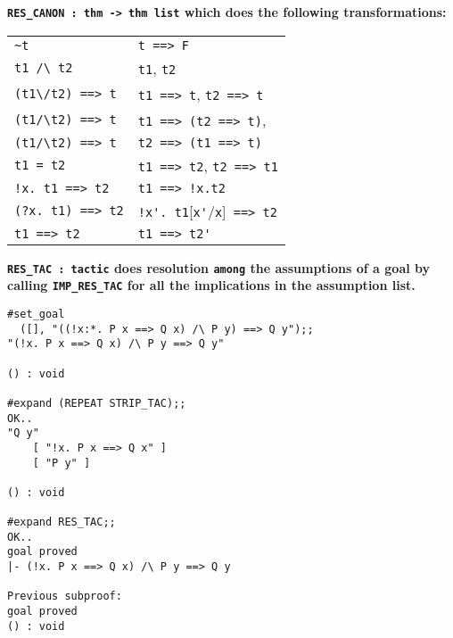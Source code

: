 \vskip7mm
\bspindent\Large\bf
\verb!RES_CANON : thm -> thm list!
\espindent
\vskip7mm
\bpindent\LARGE\bf
which does the following transformations:
\espindent
\vskip7mm
{\Large
\noindent\begin{tabular}{@{\hskip\sind}l%
@{\quad$\Longrightarrow$\quad}l@{\qquad}}
  \verb!~t!    
  &  \verb!t ==> F!\\
  \verb!t1 /\ t2!	
  &  \verb!t1!, \verb!t2!\\
  \verb!(t1\/t2) ==> t !	
  &  \verb!t1 ==> t!, \verb!t2 ==> t!\\
  \verb+(t1/\t2) ==> t+ 
  &  \verb!t1 ==> (t2 ==> t)!, \\
  \verb+(t1/\t2) ==> t+  & \verb!t2 ==> (t1 ==> t)! \\
  \verb!t1 = t2!
  &  \verb!t1 ==> t2!, \verb!t2 ==> t1! \\
  \verb+!x. t1 ==> t2+ &
  \verb+t1 ==> !x.t2+ \\
  \verb+(?x. t1) ==> t2+ &
  \verb+!x'. t1+[\verb!x'!/\verb!x!]\verb+ ==> t2+ \\
  \verb!t1 ==> t2! & \verb!t1 ==> t2'! \\
\end{tabular}}





\vskip5mm
\bspindent\Large\bf
\verb!RES_TAC : tactic!
\espindent
\vskip5mm
\bpindent\LARGE\bf
does resolution {\tt among\/} the assumptions of a goal by 
calling {\tt IMP\_RES\_TAC} for all the implications in the assumption list.
\epindent




\begin{session}\begin{verbatim}
#set_goal 
  ([], "((!x:*. P x ==> Q x) /\ P y) ==> Q y");;
"(!x. P x ==> Q x) /\ P y ==> Q y"

() : void

#expand (REPEAT STRIP_TAC);;
OK..
"Q y"
    [ "!x. P x ==> Q x" ]
    [ "P y" ]

() : void

#expand RES_TAC;;
OK..
goal proved
|- (!x. P x ==> Q x) /\ P y ==> Q y

Previous subproof:
goal proved
() : void
\end{verbatim}\end{session}


